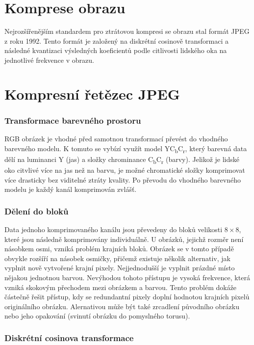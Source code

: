 \section{Komprese obrazu}
Nejrozšířenějším standardem pro ztrátovou kompresi se obrazu stal formát JPEG z roku 1992.
Tento formát je založený na diskrétní cosinově transformaci a následné kvantizaci výsledných koeficientů podle citlivosti lidského oka na jednotlivé frekvence v obrazu.

\section{Kompresní řetězec JPEG}
\label{jpeg}

\subsubsection*{Transformace barevného prostoru}

RGB obrázek je vhodné před samotnou transformací převést do vhodného barevného modelu.
K tomuto se vybízí využít model YC\textsubscript{b}C\textsubscript{r}, který barevná data dělí na luminanci Y (jas) a složky chrominance C\textsubscript{b}C\textsubscript{r} (barvy).
Jelikož je lidské oko citvlivé více na jas než na barvu, je možné chromatické složky komprimovat více drasticky bez viditelné ztráty kvality.
Po převodu do vhodného barevného modelu je každý kanál komprimován zvlášť.

\subsubsection*{Dělení do bloků}

Data jednoho komprimovaného kanálu jsou převedeny do bloků velikosti $8\times8$, které jsou následně komprimovány individuálně.
U obrázků, jejichž rozměr není násobkem osmi, vzniká problém krajních bloků.
Obrázek se v tomto případě obvykle rozšíří na násobek osmičky, přičemž existuje několik alternativ, jak vyplnit nově vytvořené krajní pixely.
Nejjednodušší je vyplnit prázdné místo nějakou jednotnou barvou.
Nevýhodou tohoto přístupu je vysoká frekvence, která vzniká skokovým přechodem mezi obrázkem a barvou.
Tento problém dokáže částečně řešit přístup, kdy se redundantní pixely doplní hodnotou krajních pixelů originálního obrázku.
Alernativou může být také zrcadlení původního obrázku nebo jeho opakování (svinutí obrázku do pomyslného torusu).

\subsubsection*{Diskrétní cosinova transformace}

